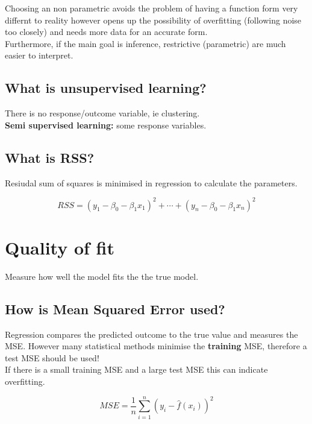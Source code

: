 \documentclass[11pt]{scrartcl} %
\begin{document}
Choosing an non parametric avoids the problem of having a function form very differnt to reality however opens up
the possibility of overfitting (following noise too closely) and needs more data for an accurate form.\\

Furthermore, if the main goal is inference, restrictive (parametric) are much easier to interpret.

\subsection{What is unsupervised learning?}

There is no response/outcome variable, ie clustering.\\

\textbf{Semi supervised learning:} some response variables.

\subsection{What is RSS?}

Resiudal sum of squares is minimised in regression to calculate the parameters.

\begin{equation}
	RSS = (y_1-\beta_0-\beta_1x_1)^2 + \cdots +(y_n-\beta_0-\beta_1x_n)^2
\end{equation}

\section{Quality of fit}

Measure how well the model fits the the true model.

\subsection{How is Mean Squared Error used?}

Regression compares the predicted outcome to the true value and measures the MSE. However many
statistical methods minimise the \textbf{training} MSE, therefore a test MSE should be used!\\

If there is a small training MSE and a large test MSE this can indicate overfitting.

\begin{equation}
	MSE = \frac{1}{n}\sum^n_{i=1}{(y_i-\hat{f}(x_i))^2}
\end{equation}
\end{document}
